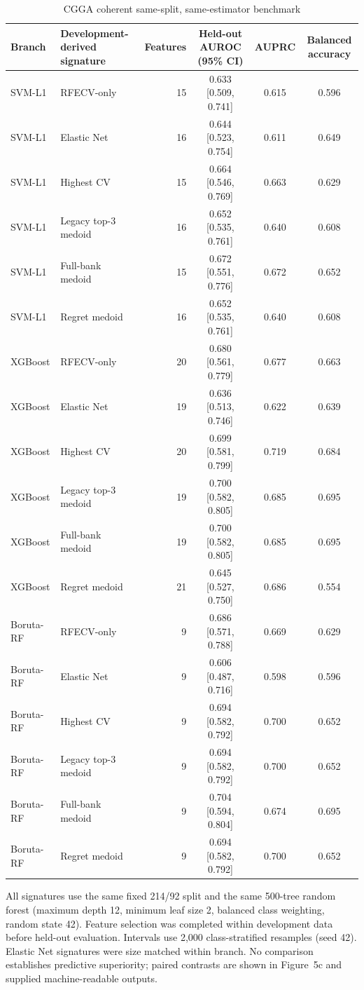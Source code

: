 \begin{table}[p]
\centering
\caption{CGGA coherent same-split, same-estimator benchmark}
\label{tab:supp23}
\scriptsize
\begin{tabular}{llrccc}
\toprule
Branch & Development-derived signature & Features & Held-out AUROC (95\% CI) & AUPRC & Balanced accuracy \\
\midrule
SVM-L1 & RFECV-only & 15 & 0.633 [0.509, 0.741] & 0.615 & 0.596 \\
SVM-L1 & Elastic Net & 16 & 0.644 [0.523, 0.754] & 0.611 & 0.649 \\
SVM-L1 & Highest CV & 15 & 0.664 [0.546, 0.769] & 0.663 & 0.629 \\
SVM-L1 & Legacy top-3 medoid & 16 & 0.652 [0.535, 0.761] & 0.640 & 0.608 \\
SVM-L1 & Full-bank medoid & 15 & 0.672 [0.551, 0.776] & 0.672 & 0.652 \\
SVM-L1 & Regret medoid & 16 & 0.652 [0.535, 0.761] & 0.640 & 0.608 \\
XGBoost & RFECV-only & 20 & 0.680 [0.561, 0.779] & 0.677 & 0.663 \\
XGBoost & Elastic Net & 19 & 0.636 [0.513, 0.746] & 0.622 & 0.639 \\
XGBoost & Highest CV & 20 & 0.699 [0.581, 0.799] & 0.719 & 0.684 \\
XGBoost & Legacy top-3 medoid & 19 & 0.700 [0.582, 0.805] & 0.685 & 0.695 \\
XGBoost & Full-bank medoid & 19 & 0.700 [0.582, 0.805] & 0.685 & 0.695 \\
XGBoost & Regret medoid & 21 & 0.645 [0.527, 0.750] & 0.686 & 0.554 \\
Boruta-RF & RFECV-only & 9 & 0.686 [0.571, 0.788] & 0.669 & 0.629 \\
Boruta-RF & Elastic Net & 9 & 0.606 [0.487, 0.716] & 0.598 & 0.596 \\
Boruta-RF & Highest CV & 9 & 0.694 [0.582, 0.792] & 0.700 & 0.652 \\
Boruta-RF & Legacy top-3 medoid & 9 & 0.694 [0.582, 0.792] & 0.700 & 0.652 \\
Boruta-RF & Full-bank medoid & 9 & 0.704 [0.594, 0.804] & 0.674 & 0.695 \\
Boruta-RF & Regret medoid & 9 & 0.694 [0.582, 0.792] & 0.700 & 0.652 \\
\bottomrule
\end{tabular}
\begin{minipage}{0.98\linewidth}\scriptsize\vspace{0.3em}
All signatures use the same fixed 214/92 split and the same 500-tree random forest (maximum depth 12, minimum leaf size 2, balanced class weighting, random state 42). Feature selection was completed within development data before held-out evaluation. Intervals use 2,000 class-stratified resamples (seed 42). Elastic Net signatures were size matched within branch. No comparison establishes predictive superiority; paired contrasts are shown in Figure~5c and supplied machine-readable outputs.
\end{minipage}
\end{table}
